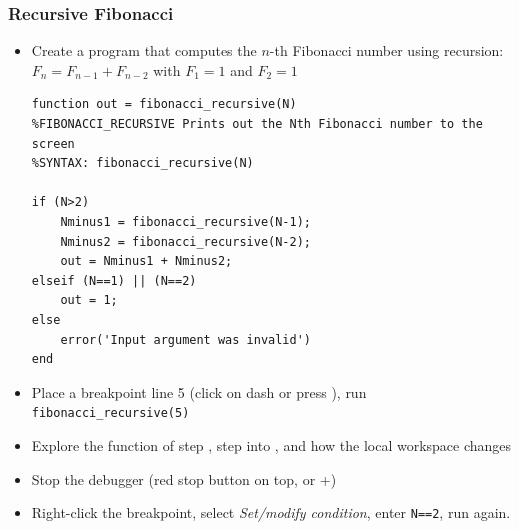 \begin{frame}[fragile]
  \frametitle{Recursive Fibonacci}
  \begin{itemize}
    \item Create a program that computes the $n$-th Fibonacci number using recursion:\\
    $F_n = F_{n-1} + F_{n-2}$ with $F_1 = 1$ and $F_2 = 1$
    \pause
    \lstset{numbers=left}
  \begin{lstlisting}
function out = fibonacci_recursive(N)
%FIBONACCI_RECURSIVE Prints out the Nth Fibonacci number to the screen
%SYNTAX: fibonacci_recursive(N)

if (N>2)
    Nminus1 = fibonacci_recursive(N-1);
    Nminus2 = fibonacci_recursive(N-2);
    out = Nminus1 + Nminus2;
elseif (N==1) || (N==2)
    out = 1;
else
    error('Input argument was invalid')
end
  \end{lstlisting}
  \pause
    \item Place a breakpoint line 5 (click on dash or press ), run \lstinline$fibonacci_recursive(5)$
    \item Explore the function of step , step into , and how the local workspace changes
    \item Stop the debugger (red stop button on top, or +)
    \item Right-click the breakpoint, select \emph{Set/modify condition}, enter \lstinline$N==2$, run again.
  \end{itemize}
\end{frame}


